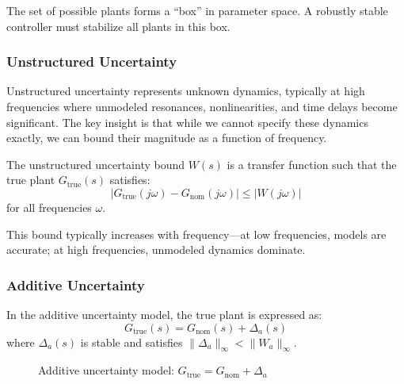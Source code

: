 The set of possible plants forms a ``box'' in parameter space. A robustly stable controller must stabilize all plants in this box.

\subsubsection{Unstructured Uncertainty}

Unstructured uncertainty represents unknown dynamics, typically at high frequencies where unmodeled resonances, nonlinearities, and time delays become significant. The key insight is that while we cannot specify these dynamics exactly, we can bound their magnitude as a function of frequency.

\begin{definition}
The unstructured uncertainty bound $W(s)$ is a transfer function such that the true plant $G_{\text{true}}(s)$ satisfies:
\begin{equation}
|G_{\text{true}}(j\omega) - G_{\text{nom}}(j\omega)| \leq |W(j\omega)|
\label{eq:unstructured_bound}
\end{equation}
for all frequencies $\omega$.
\end{definition}

This bound typically increases with frequency---at low frequencies, models are accurate; at high frequencies, unmodeled dynamics dominate.

\subsubsection{Additive Uncertainty}

In the additive uncertainty model, the true plant is expressed as:
\begin{equation}
G_{\text{true}}(s) = G_{\text{nom}}(s) + \Delta_a(s)
\label{eq:additive}
\end{equation}
where $\Delta_a(s)$ is stable and satisfies $\|\Delta_a\|_\infty < \|W_a\|_\infty$.

\begin{figure}[htbp]
\centering
{}
\caption{Additive uncertainty model: $G_{\text{true}} = G_{\text{nom}} + \Delta_a$}
\label{fig:additive}
\end{figure}

